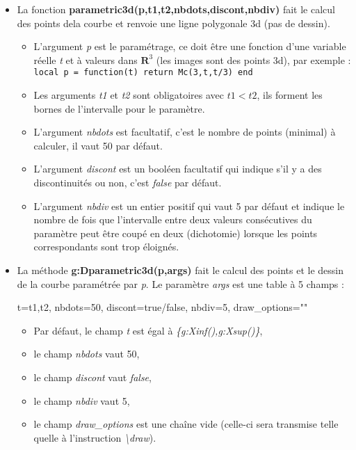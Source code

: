 \begin{itemize}
\item La fonction \textbf{parametric3d(p,t1,t2,nbdots,discont,nbdiv)} fait le calcul des points dela courbe et renvoie une ligne polygonale 3d (pas de dessin).
  \begin{itemize}
    \item L'argument \emph{p} est le paramétrage, ce doit être une fonction d'une variable réelle \emph{t} et à valeurs dans $\mathbf R^3$ (les images sont des points 3d), par exemple :
    \texttt{local p = function(t) return Mc(3,t,t/3) end}
    
    \item  Les arguments \emph{t1} et \emph{t2} sont obligatoires avec \(t1 < t2\), ils forment les bornes de l'intervalle pour le paramètre.
    
    \item L'argument \emph{nbdots} est facultatif, c'est le nombre de points (minimal) à calculer, il vaut 50 par défaut.
    
    \item L'argument \emph{discont} est un booléen facultatif qui indique s'il y a des discontinuités ou non, c'est \emph{false} par défaut.
    
    \item L'argument \emph{nbdiv} est un entier positif qui vaut 5 par défaut et indique le nombre de fois que l'intervalle entre deux valeurs consécutives du paramètre peut être coupé en deux (dichotomie) lorsque les points correspondants sont trop éloignés.
  \end{itemize}
  
\item La méthode \textbf{g:Dparametric3d(p,args)} fait le calcul des points et le dessin de la courbe paramétrée par \emph{p}. Le paramètre \emph{args} est une table à 5 champs :

\begin{TeXcode}
 { t={t1,t2}, nbdots=50, discont=true/false, nbdiv=5, draw_options="" }
\end{TeXcode}

  \begin{itemize}
      \item Par défaut, le champ \emph{t} est égal à \emph{\{g:Xinf(),g:Xsup()\}},
      \item le champ \emph{nbdots} vaut 50, 
      \item le champ \emph{discont} vaut \emph{false},
      \item le champ \emph{nbdiv} vaut 5,
      \item le champ \emph{draw\_options} est une chaîne vide (celle-ci sera transmise telle quelle à l'instruction \emph{\textbackslash draw}).
  \end{itemize}
\end{itemize} 

